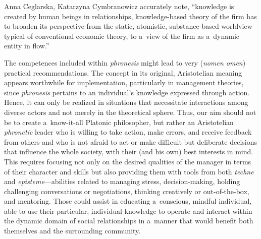 \begin{artengenv2auth}{Anna Ceglarska, Katarzyna Cymbranowicz}
\parencite*[][p.242]{nonaka_managing_2008} %
 accurately note, ``knowledge is created by human beings in relationships, knowledge-based theory of the firm has to broaden its perspective from the static, atomistic, substance-based worldview typical of conventional economic theory, to a~view of the firm as a~dynamic entity in flow.''



The competences included within \textit{phronesis} might lead to very (\textit{nomen omen}) practical recommendations. The concept in its original, Aristotelian meaning appears worthwhile for implementation, particularly in management theories, since \textit{phronesis} pertains to an individual's knowledge expressed through action. Hence, it can only be realized in situations that necessitate interactions among diverse actors and not merely in the theoretical sphere. Thus, our aim should not be to create a~know-it-all Platonic philosopher, but rather an Aristotelian \textit{phronetic} leader who is willing to take action, make errors, and receive feedback from others and who is not afraid to act or make difficult but deliberate decisions that influence the whole society, with their (and his own) best interests in mind. This requires focusing not only on the desired qualities of the manager in terms of their character and skills but also providing them with tools from both \textit{techne} and \textit{episteme}---abilities related to managing stress, decision-making, holding challenging conversations or negotiations, thinking creatively or out-of-the-box, and mentoring. Those could assist in educating a~conscious, mindful individual, able to use their particular, individual knowledge to operate and interact within the dynamic domain of social relationships in a~manner that would benefit both themselves and the surrounding community.



\end{artengenv2auth}

\label{ceglarska-lastpage}
